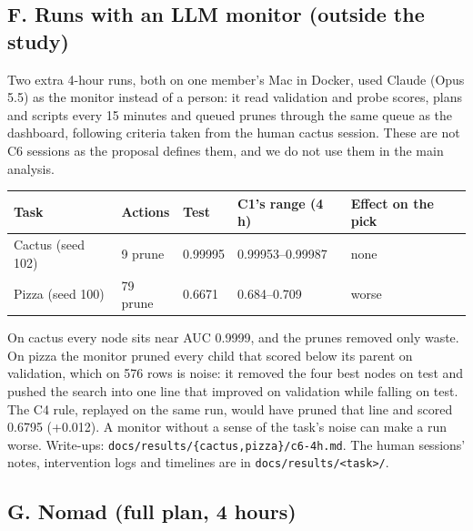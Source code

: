\documentclass[11pt]{article}
\begin{document}
\subsection*{F. Runs with an LLM monitor (outside the study)}

Two extra 4-hour runs, both on one member's Mac in Docker, used Claude (Opus 5.5)
\cite{claude} as the monitor instead of a person: it read validation and probe scores, plans and scripts
every 15 minutes and queued prunes through the same queue as the dashboard, following
criteria taken from the human cactus session. These are not C6 sessions as the proposal
defines them, and we do not use them in the main analysis.

\begin{table}[H]
\centering
\small
\begin{tabular}{@{}lllll@{}}
\toprule
\textbf{Task} & \textbf{Actions} & \textbf{Test} & \textbf{C1's range (4 h)} & \textbf{Effect on the pick} \\
\midrule
Cactus (seed 102) & 9 prune & 0.99995 & 0.99953--0.99987 & none \\
Pizza (seed 100) & 79 prune & 0.6671 & 0.684--0.709 & worse \\
\bottomrule
\end{tabular}
\end{table}

On cactus every node sits near AUC 0.9999, and the prunes removed only waste. On pizza
the monitor pruned every child that scored below its parent on validation, which on 576
rows is noise: it removed the four best nodes on test and pushed the search into one
line that improved on validation while falling on test. The C4 rule, replayed on the
same run, would have pruned that line and scored 0.6795 (+0.012). A monitor without a
sense of the task's noise can make a run worse. Write-ups:
\texttt{docs/results/\{cactus,pizza\}/c6-4h.md}. The human sessions' notes, intervention
logs and timelines are in \texttt{docs/results/<task>/}.

\subsection*{G. Nomad (full plan, 4 hours)}
\end{document}
